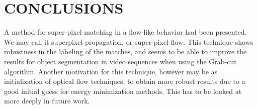 \section{CONCLUSIONS}

A method for super-pixel matching in a flow-like
behavior had been presented. We may call it superpixel propagation, or super-pixel flow. This
technique shows robustness in the labeling of the
matches, and seems to be able to improve the results
for object segmentation in video sequences when
using the Grab-cut algorithm. Another motivation for
this technique, however may be as initialization of
optical flow techniques, to obtain more robust results
due to a good initial guess for energy minimization
methods. This has to be looked at more deeply in future work.